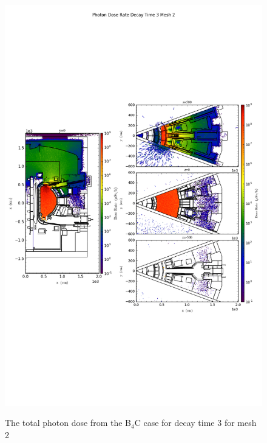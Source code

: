 \begin{figure}[ht!]
\centering
\includegraphics[trim={0cm 9cm 0cm 10cm},clip,scale=0.75]{../plots/final_model_with_b4c/Photon_Dose_Rate_Decay_Time_3_Mesh_2.png}
\label{fig:photons_dc3_no4bc_m2_flux}
\caption{The total photon dose from the B$_4$C case for decay time 3 for mesh 2}
\end{figure}
